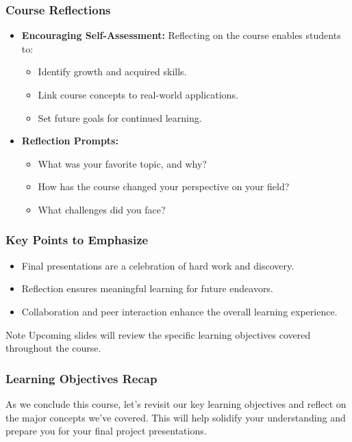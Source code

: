 \documentclass[aspectratio=169]{beamer}
\begin{document}
\begin{frame}[fragile]
    \frametitle{Course Reflections}
    
    \begin{itemize}
        \item \textbf{Encouraging Self-Assessment:}
        Reflecting on the course enables students to:
        \begin{itemize}
            \item Identify growth and acquired skills.
            \item Link course concepts to real-world applications.
            \item Set future goals for continued learning.
        \end{itemize}
        
        \item \textbf{Reflection Prompts:}
        \begin{itemize}
            \item What was your favorite topic, and why?
            \item How has the course changed your perspective on your field?
            \item What challenges did you face?
        \end{itemize}
    \end{itemize}
\end{frame}

\begin{frame}[fragile]
    \frametitle{Key Points to Emphasize}

    \begin{itemize}
        \item Final presentations are a celebration of hard work and discovery.
        \item Reflection ensures meaningful learning for future endeavors.
        \item Collaboration and peer interaction enhance the overall learning experience.
    \end{itemize}

    \begin{block}{Note}
        Upcoming slides will review the specific learning objectives covered throughout the course.
    \end{block}
\end{frame}

\begin{frame}[fragile]
    \frametitle{Learning Objectives Recap}
    As we conclude this course, let’s revisit our key learning objectives and reflect on the major concepts we've covered. This will help solidify your understanding and prepare you for your final project presentations.
\end{frame}
\end{document}
